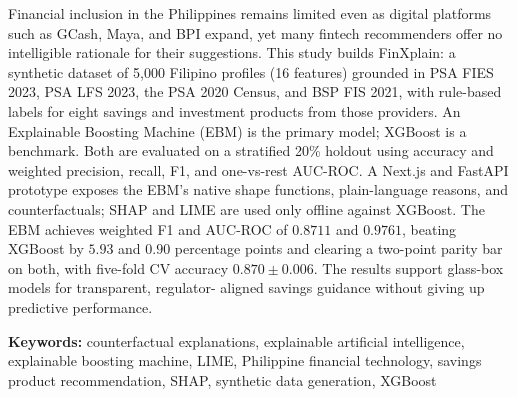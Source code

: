 \documentclass{icsthesis}
\begin{document}
\begin{frontmatter}
\begin{abstractwithpageno}
			Financial inclusion in the Philippines remains limited even as digital platforms such as GCash, Maya, and BPI expand, yet many fintech recommenders offer no intelligible rationale for their suggestions. This study builds FinXplain: a synthetic dataset of 5{,}000 Filipino profiles (16 features) grounded in PSA FIES 2023, PSA LFS 2023, the PSA 2020 Census, and BSP FIS 2021, with rule-based labels for eight savings and investment products from those providers. An Explainable Boosting Machine (EBM) is the primary model; XGBoost is a benchmark. Both are evaluated on a stratified 20\% holdout using accuracy and weighted precision, recall, F1, and one-vs-rest AUC-ROC. A Next.js and FastAPI prototype exposes the EBM's native shape functions, plain-language reasons, and counterfactuals; SHAP and LIME are used only offline against XGBoost. The EBM achieves weighted F1 and AUC-ROC of $0.8711$ and $0.9761$, beating XGBoost by $5.93$ and $0.90$ percentage points and clearing a two-point parity bar on both, with five-fold CV accuracy $0.870 \pm 0.006$. The results support glass-box models for transparent, regulator- aligned savings guidance without giving up predictive performance.

			\vspace{2ex}
			\noindent\textbf{Keywords:} counterfactual explanations, explainable artificial intelligence, explainable boosting machine, LIME, Philippine financial technology, savings product recommendation, SHAP, synthetic data generation, XGBoost
		\end{abstractwithpageno}

	\end{frontmatter}
	
\end{document}
